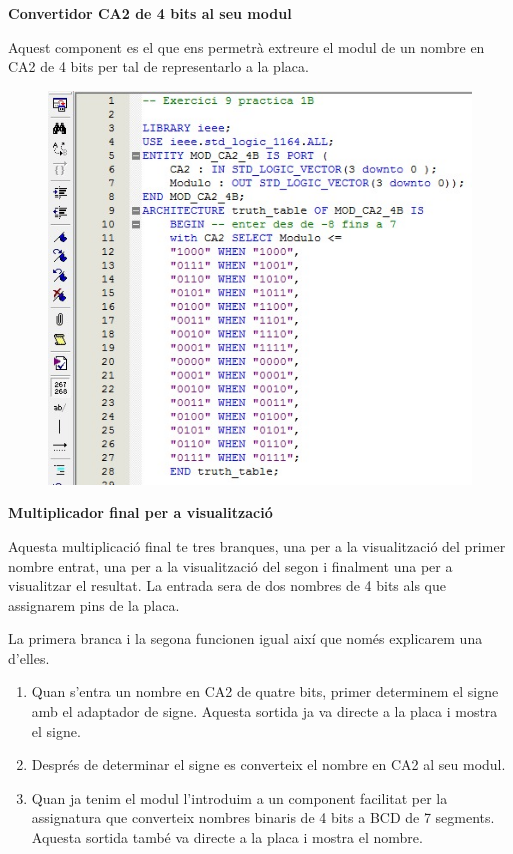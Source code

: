 \documentclass[12pt, a4papre]{article}
\begin{document}
	\textbf{\large{Convertidor CA2 de 4 bits al seu modul}}
	
	Aquest component es el que ens permetrà extreure el modul de un nombre en CA2 de 4 bits per tal de representarlo a la placa.
	
	\begin{center}
	\begin{figure}[H]
		\begin{center}
		\includegraphics[width=150mm]{ConvCA2_4aMOD.jpeg}
		\end{center}
	\end{figure}
	
	\end{center}
	
	\textbf{\large{Multiplicador final per a visualització}}
	
	Aquesta multiplicació final te tres branques, una per a la visualització del primer nombre entrat, una per a la visualització del segon i finalment una per a visualitzar el resultat. La entrada sera de dos nombres de 4 bits als que assignarem pins de la placa. 
	
	La primera branca i la segona funcionen igual així que només explicarem una d'elles. 
	\begin{enumerate}
	\item Quan s'entra un nombre en CA2 de quatre bits, primer determinem el signe amb el adaptador de signe. Aquesta sortida ja va directe a la placa i mostra el signe.
	\item Després de determinar el signe es converteix el nombre en CA2 al seu modul.
	\item Quan ja tenim el modul l'introduim a un component facilitat per la assignatura que converteix nombres binaris de 4 bits a BCD de 7 segments. Aquesta sortida també va directe a la placa i mostra el nombre.
	\end{enumerate}
	
\end{document}
